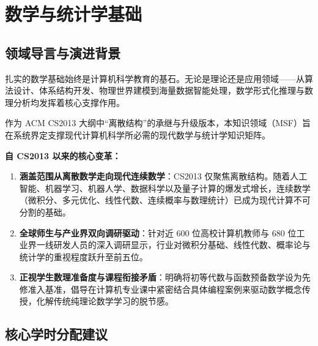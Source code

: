 \chapter{数学与统计学基础}

\section{领域导言与演进背景}

\begin{preamblebox}[知识领域概述与变革]
扎实的数学基础始终是计算机科学教育的基石。无论是理论还是应用领域——从算法设计、体系结构开发、物理世界建模到海量数据智能处理，数学形式化推理与数理分析均发挥着核心支撑作用。

作为 ACM CS2013 大纲中“离散结构”的承继与升级版本，本知识领域（MSF）旨在系统界定支撑现代计算机科学所必需的现代数学与统计学知识矩阵。

\textbf{自 CS2013 以来的核心变革：}
\begin{enumerate}
    \item \textbf{涵盖范围从离散数学走向现代连续数学}：CS2013 仅聚焦离散结构。随着人工智能、机器学习、机器人学、数据科学以及量子计算的爆发式增长，连续数学（微积分、多元优化、线性代数、连续概率与数理统计）已成为现代计算不可分割的基础。
    \item \textbf{全球师生与产业界双向调研驱动}：针对近 600 位高校计算机教师与 680 位工业界一线研发人员的深入调研显示，行业对微积分基础、线性代数、概率论与统计学的重视程度跃升至前五位。
    \item \textbf{正视学生数理准备度与课程衔接矛盾}：明确将初等代数与函数预备数学设为先修准入基准，倡导在计算机专业课中紧密结合具体编程案例来驱动数学概念传授，化解传统纯理论数学学习的脱节感。
\end{enumerate}
\end{preamblebox}

\section{核心学时分配建议}

